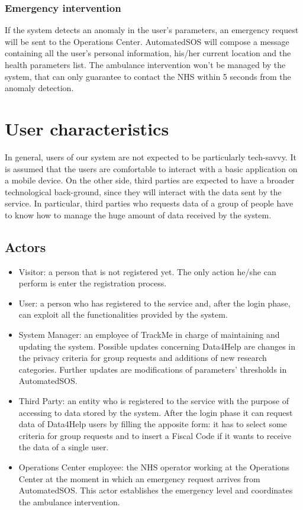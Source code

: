         \subsubsection {Emergency intervention}
            If the system detects an anomaly in the user's parameters, an emergency request will be sent to the Operations Center.
            AutomatedSOS will compose a message containing all the user's personal information, his/her current location and the health parameters list.  
            The ambulance intervention won't be managed by the system, that can only guarantee to contact the NHS within 5 seconds from the anomaly detection.  

\section{User characteristics}
    In general, users of our system are not expected to be particularly tech-savvy. It is assumed that the users are comfortable to interact with a basic application on a mobile device.
    On the other side, third parties are expected to have a broader technological back-ground, since they will interact with the data sent by the service.
    In particular, third parties who requests data of a group of people have to know how to manage the huge amount of data received by the system.
    
    \subsection{Actors}
    \begin{itemize}
        \item Visitor: a person that is not registered yet. The only action he/she can perform is enter the registration process.
        \item User: a person who has registered to the service and, after the login phase, can exploit all the functionalities provided by the system.
        \item System Manager: an employee of TrackMe in charge of maintaining and updating the system.
        Possible updates concerning Data4Help are changes in the privacy criteria for group requests and additions of new research categories.  Further updates are modifications of parameters' thresholds in AutomatedSOS.
        \item Third Party: an entity who is registered to the service with the purpose of accessing to data stored by the system.
        After the login phase it can request data of Data4Help users by filling the apposite form: it has to select some criteria for group requests and to insert a Fiscal Code if it wants to receive the data of a single user. 
        \item Operations Center employee: the NHS operator working at the Operations Center at the moment in which an emergency request arrives from AutomatedSOS. This actor establishes the emergency level and coordinates the ambulance intervention.  
    \end{itemize}
    
